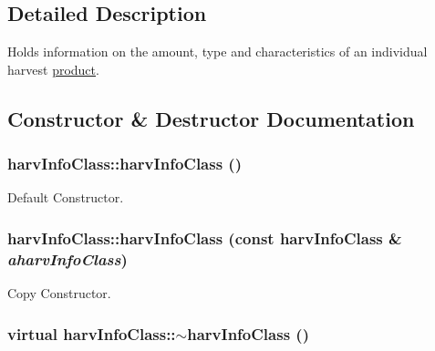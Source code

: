 \subsection{Detailed Description}
Holds information on the amount, type and characteristics of an individual harvest \hyperlink{classproduct}{product}. 

\subsection{Constructor \& Destructor Documentation}
\hypertarget{classharv_info_class_a8ac8ed72179f9ebae816c3eec0cacb2d}{
\subsubsection[{harvInfoClass}]{\setlength{\rightskip}{0pt plus 5cm}harvInfoClass::harvInfoClass ()}}
\label{classharv_info_class_a8ac8ed72179f9ebae816c3eec0cacb2d}


Default Constructor. \hypertarget{classharv_info_class_a137ea57a9a1bd2fb6ade546eec085114}{
\subsubsection[{harvInfoClass}]{\setlength{\rightskip}{0pt plus 5cm}harvInfoClass::harvInfoClass (const {\bf harvInfoClass} \& {\em aharvInfoClass})}}
\label{classharv_info_class_a137ea57a9a1bd2fb6ade546eec085114}


Copy Constructor. \hypertarget{classharv_info_class_ae0fbc3cf9b27de7cc3f9357691243a71}{
\subsubsection[{$\sim$harvInfoClass}]{\setlength{\rightskip}{0pt plus 5cm}virtual harvInfoClass::$\sim$harvInfoClass ()}}
\label{classharv_info_class_ae0fbc3cf9b27de7cc3f9357691243a71}



